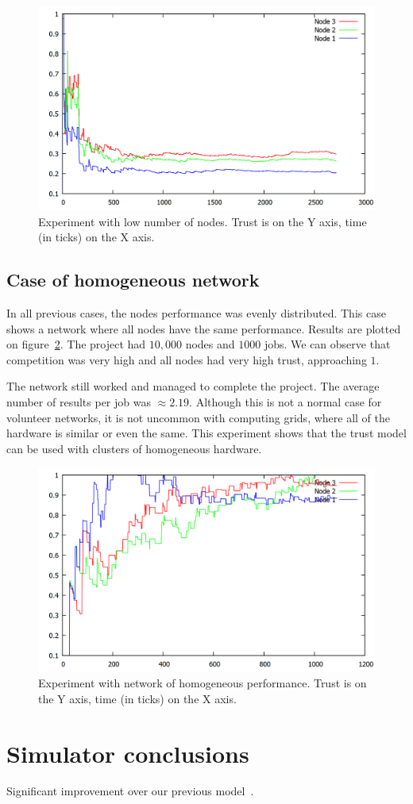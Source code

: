 \begin{figure}
\centering
\includegraphics[width=\textwidth]{diagrams/trust_less_nodes.png}
\caption{Experiment with low number of nodes. Trust is on the Y axis, time (in ticks) on the X axis.}
\label{f:more_jobs}
\end{figure}

\FloatBarrier

\subsection{Case of homogeneous network}

In all previous cases, the nodes performance was evenly distributed. This case shows a network where all nodes have the same performance. Results are plotted on figure~\ref{f:evenly}. The project had $10,000$ nodes and $1000$ jobs. We can observe that competition was very high and all nodes had very high trust, approaching $1$.

The network still worked and managed to complete the project. The average number of results per job was $\approx 2.19$. Although this is not a normal case for volunteer networks, it is not uncommon with computing grids, where all of the hardware is similar or even the same. This experiment shows that the trust model can be used with clusters of homogeneous hardware.

\begin{figure}
\centering
\includegraphics[width=\textwidth]{diagrams/trust_static.png}
\caption{Experiment with network of homogeneous performance. Trust is on the Y axis, time (in ticks) on the X axis.}
\label{f:evenly}
\end{figure}

\section{Simulator conclusions}

Significant improvement over our previous model~\cite{zochniakreliable}.